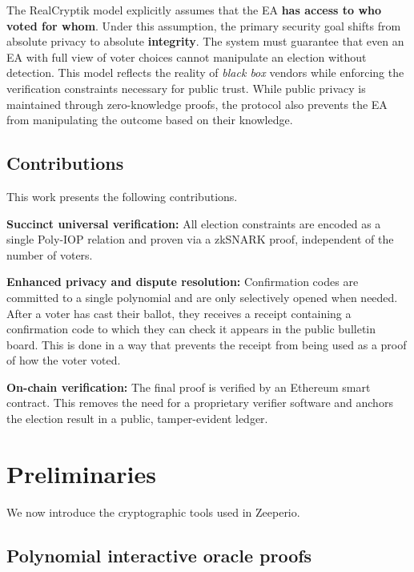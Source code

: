 \documentclass{llncs}
\begin{document}
The RealCryptik model explicitly assumes that the EA \textbf{has access to who voted for whom}. Under this assumption, the primary security goal shifts from absolute privacy to absolute \textbf{integrity}. 
The system must guarantee that even an EA with full view of voter choices cannot manipulate an election without detection. This model reflects the reality of \emph{black box} vendors while enforcing the verification constraints necessary for public trust. 
While public privacy is maintained through zero-knowledge proofs, the protocol also prevents the EA from manipulating the outcome based on their knowledge.

\subsection{Contributions}
This work presents the following contributions.

\begin{description} 
\item \textbf{Succinct universal verification:} All election constraints are encoded as a single Poly-IOP relation and proven via a zkSNARK proof, independent of the number of voters.
\item \textbf{Enhanced privacy and dispute resolution:}
  Confirmation codes are committed to a single polynomial and are only selectively opened when needed.
  After a voter has cast their ballot, they receives a receipt containing a confirmation code to which they can check it appears in the public bulletin board. 
 This is done in a way that prevents the receipt from being used as a proof of how the voter voted.
  \item \textbf{On-chain verification:}
  The final proof is verified by an Ethereum smart contract. This removes the need for a proprietary verifier software and anchors the election result in a public, tamper-evident ledger.
\end{description}


\section{Preliminaries}

We now introduce the cryptographic tools used in Zeeperio.

\subsection{Polynomial interactive oracle proofs}
\end{document}

